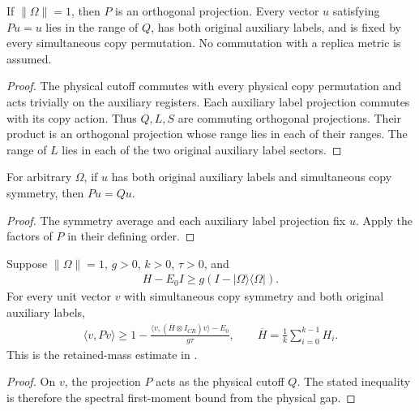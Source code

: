 \begin{theorem}
\label{thm:replica_low_defect_projection_conditions}
\leanok
{}
If $\|\Omega\|=1$, then $P$ is an orthogonal projection.
Every vector $u$ satisfying $Pu=u$ lies in the range of $Q$, has both
original auxiliary labels, and is fixed by every simultaneous copy
permutation. No commutation with a replica metric is assumed.
\end{theorem}
\begin{proof}
\leanok
{}
The physical cutoff commutes with every physical copy permutation and
acts trivially on the auxiliary registers. Each auxiliary label
projection commutes with its copy action. Thus $Q,L,S$ are commuting
orthogonal projections. Their product is an orthogonal projection
whose range lies in each of their ranges. The range of $L$ lies in
each of the two original auxiliary label sectors.
\end{proof}

\begin{theorem}
\label{thm:replica_low_defect_projection_on_sector}
\leanok
{}
For arbitrary $\Omega$, if $u$ has both original auxiliary labels and
simultaneous copy symmetry, then $Pu=Qu$.
\end{theorem}
\begin{proof}
\leanok
The symmetry average and each auxiliary label projection fix $u$.
Apply the factors of $P$ in their defining order.
\end{proof}

\begin{theorem}
\label{thm:replica_low_defect_projection_gap_mass}
\leanok
Suppose $\|\Omega\|=1$, $g>0$, $k>0$, $\tau>0$, and
\begin{align}
 H-E_0I\ge g(I-|\Omega\rangle\langle\Omega|).
\end{align}
For every unit vector $v$ with simultaneous copy symmetry and both
original auxiliary labels,
\begin{align}
 \langle v,Pv\rangle\ge
 1-\frac{\langle v,(\overline H\otimes I_{CR})v\rangle-E_0}{g\tau},
 \qquad \overline H=\frac1k\sum_{i=0}^{k-1}H_i.
\end{align}
This is the retained-mass estimate in
\cite[Section~8, \textup{(comparator:defect-mass)}]{OpenAI2026AreaLaw}.
\end{theorem}
\begin{proof}
\leanok
{}
On $v$, the projection $P$ acts as the physical cutoff $Q$. The stated
inequality is therefore the spectral first-moment bound from the
physical gap.
\end{proof}

